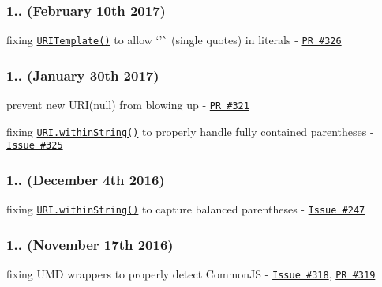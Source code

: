\subsubsection*{1.. (February 10th 2017)}


\begin{DoxyItemize}
\item fixing \href{http://medialize.github.io/URI.js/uri-template.html}{\tt {\ttfamily U\+R\+I\+Template()}} to allow `'\`{} (single quotes) in literals -\/ \href{https://github.com/medialize/URI.js/pull/326}{\tt PR \#326}
\end{DoxyItemize}

\subsubsection*{1.. (January 30th 2017)}


\begin{DoxyItemize}
\item prevent {\ttfamily new U\+R\+I(null)} from blowing up -\/ \href{https://github.com/medialize/URI.js/issues/321}{\tt PR \#321}
\item fixing \href{http://medialize.github.io/URI.js/docs.html#static-withinString}{\tt {\ttfamily U\+R\+I.\+within\+String()}} to properly handle fully contained parentheses -\/ \href{https://github.com/medialize/URI.js/issues/325}{\tt Issue \#325}
\end{DoxyItemize}

\subsubsection*{1.. (December 4th 2016)}


\begin{DoxyItemize}
\item fixing \href{http://medialize.github.io/URI.js/docs.html#static-withinString}{\tt {\ttfamily U\+R\+I.\+within\+String()}} to capture balanced parentheses -\/ \href{https://github.com/medialize/URI.js/issues/247}{\tt Issue \#247}
\end{DoxyItemize}

\subsubsection*{1.. (November 17th 2016)}


\begin{DoxyItemize}
\item fixing U\+MD wrappers to properly detect Common\+JS -\/ \href{https://github.com/medialize/URI.js/issues/318}{\tt Issue \#318}, \href{https://github.com/medialize/URI.js/pull/319}{\tt PR \#319}
\end{DoxyItemize}

